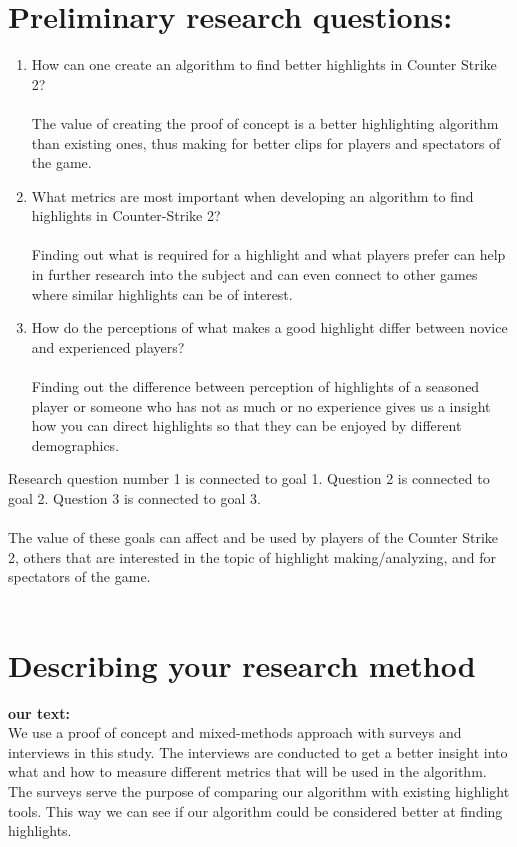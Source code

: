 \section{Preliminary research questions:}
\normalsize
\begin{enumerate}[label=RQ\arabic*., leftmargin=*]
    \item How can one create an algorithm to find better highlights in Counter Strike 2? \\\\
    The value of creating the proof of concept is a better highlighting algorithm than existing ones, thus making for better clips for players and spectators of the game. 
    \item What metrics are most important when developing an algorithm to find highlights in Counter-Strike 2? \\\\
    Finding out what is required for a highlight and what players prefer can help in further research into the subject and can even connect to other games where similar highlights can be of interest.
    \item How do the perceptions of what makes a good highlight differ between novice and experienced players?\\\\
    Finding out the difference between perception of highlights of a seasoned player or someone who has not as much or no experience gives us a insight how you can direct highlights so that they can be enjoyed by different demographics. 
    
\end{enumerate}
Research question number 1 is connected to goal 1. Question 2 is connected to goal 2. Question 3 is connected to goal 3.\\\\
The value of these goals can affect and be used by players of the Counter Strike 2, others that are interested in the topic of highlight making/analyzing, and for spectators of the game.\\\\

\section{Describing your research method}
\textbf{our text:}\\
We use a proof of concept and mixed-methods approach with surveys and interviews in this study. The interviews are conducted to get a better insight into what and how to measure different metrics that will be used in the algorithm. The surveys serve the purpose of comparing our algorithm with existing highlight tools. This way we can see if our algorithm could be considered better at finding highlights.
